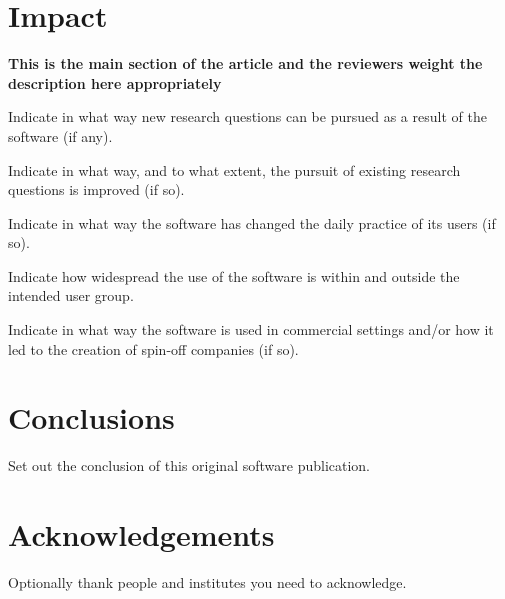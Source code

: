 \documentclass[preprint,12pt, a4paper]{elsarticle}
\begin{document}
\section{Impact}
\label{}

\textbf{This is the main section of the article and the reviewers weight the description here appropriately}

Indicate in what way new research questions can be pursued as a result of the software (if any).

Indicate in what way, and to what extent, the pursuit of existing research questions is improved (if so).

Indicate in what way the software has changed the daily practice of its users (if so).

Indicate how widespread the use of the software is within and outside the intended user group.

Indicate in what way the software is used in commercial settings and/or how it led to the creation of spin-off companies (if so).

\section{Conclusions}
\label{}

Set out the conclusion of this original software publication.

\section*{Acknowledgements}
\label{}

Optionally thank people and institutes you need to acknowledge. 





\begin{thebibliography}{00}


\bibitem{}

\end{thebibliography}
\end{document}
